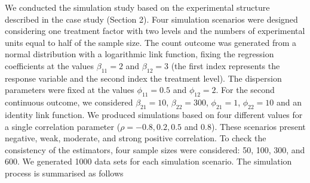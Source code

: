 \documentclass[useAMS,referee]{biom}
\begin{document}
We conducted the simulation study based on the experimental structure described in the case study (Section 2). Four simulation scenarios were designed considering one treatment factor with two levels and the numbers of experimental units equal to half of the sample size. The count outcome was generated from a normal distribution with a logarithmic link function, fixing the regression coefficients at the values $\beta_{11}=2$ and $\beta_{12}=3$ (the first index represents the response variable and the second index the treatment level). The dispersion parameters were fixed at the values $\phi_{11}=0.5$ and $\phi_{12}=2$. For the second continuous outcome, we considered $\beta_{21}=10$, $\beta_{22}=300$, $\phi_{21}=1$, $\phi_{22}=10$ and an identity link function. We produced simulations based on four different values for a single correlation parameter ($\rho = -0.8, 0.2, 0.5$ and $0.8$). These scenarios present negative, weak, moderate, and strong positive correlation. To check the consistency of the estimators, four sample sizes were considered: 50, 100, 300, and 600. We generated 1000 data sets for each simulation scenario. The simulation process is summarised as follows
\end{document}
